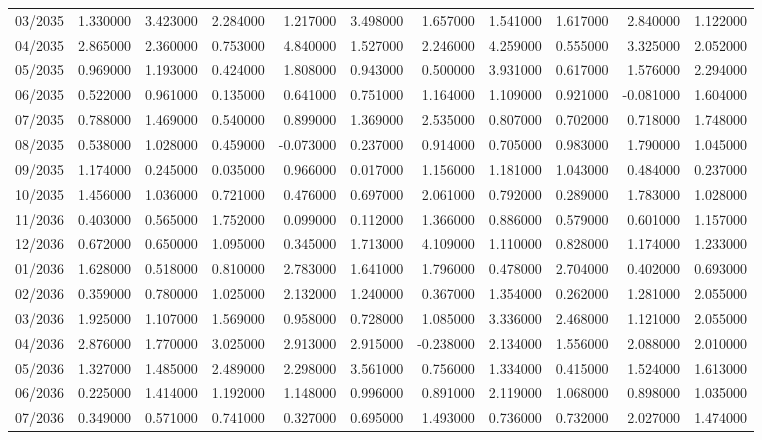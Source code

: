 \begin{tabular}{lrrrrrrrrrr}
03/2035 & 1.330000 & 3.423000 & 2.284000 & 1.217000 & 3.498000 & 1.657000 & 1.541000 & 1.617000 & 2.840000 & 1.122000 \\
04/2035 & 2.865000 & 2.360000 & 0.753000 & 4.840000 & 1.527000 & 2.246000 & 4.259000 & 0.555000 & 3.325000 & 2.052000 \\
05/2035 & 0.969000 & 1.193000 & 0.424000 & 1.808000 & 0.943000 & 0.500000 & 3.931000 & 0.617000 & 1.576000 & 2.294000 \\
06/2035 & 0.522000 & 0.961000 & 0.135000 & 0.641000 & 0.751000 & 1.164000 & 1.109000 & 0.921000 & -0.081000 & 1.604000 \\
07/2035 & 0.788000 & 1.469000 & 0.540000 & 0.899000 & 1.369000 & 2.535000 & 0.807000 & 0.702000 & 0.718000 & 1.748000 \\
08/2035 & 0.538000 & 1.028000 & 0.459000 & -0.073000 & 0.237000 & 0.914000 & 0.705000 & 0.983000 & 1.790000 & 1.045000 \\
09/2035 & 1.174000 & 0.245000 & 0.035000 & 0.966000 & 0.017000 & 1.156000 & 1.181000 & 1.043000 & 0.484000 & 0.237000 \\
10/2035 & 1.456000 & 1.036000 & 0.721000 & 0.476000 & 0.697000 & 2.061000 & 0.792000 & 0.289000 & 1.783000 & 1.028000 \\
11/2036 & 0.403000 & 0.565000 & 1.752000 & 0.099000 & 0.112000 & 1.366000 & 0.886000 & 0.579000 & 0.601000 & 1.157000 \\
12/2036 & 0.672000 & 0.650000 & 1.095000 & 0.345000 & 1.713000 & 4.109000 & 1.110000 & 0.828000 & 1.174000 & 1.233000 \\
01/2036 & 1.628000 & 0.518000 & 0.810000 & 2.783000 & 1.641000 & 1.796000 & 0.478000 & 2.704000 & 0.402000 & 0.693000 \\
02/2036 & 0.359000 & 0.780000 & 1.025000 & 2.132000 & 1.240000 & 0.367000 & 1.354000 & 0.262000 & 1.281000 & 2.055000 \\
03/2036 & 1.925000 & 1.107000 & 1.569000 & 0.958000 & 0.728000 & 1.085000 & 3.336000 & 2.468000 & 1.121000 & 2.055000 \\
04/2036 & 2.876000 & 1.770000 & 3.025000 & 2.913000 & 2.915000 & -0.238000 & 2.134000 & 1.556000 & 2.088000 & 2.010000 \\
05/2036 & 1.327000 & 1.485000 & 2.489000 & 2.298000 & 3.561000 & 0.756000 & 1.334000 & 0.415000 & 1.524000 & 1.613000 \\
06/2036 & 0.225000 & 1.414000 & 1.192000 & 1.148000 & 0.996000 & 0.891000 & 2.119000 & 1.068000 & 0.898000 & 1.035000 \\
07/2036 & 0.349000 & 0.571000 & 0.741000 & 0.327000 & 0.695000 & 1.493000 & 0.736000 & 0.732000 & 2.027000 & 1.474000 \\

\end{tabular}
